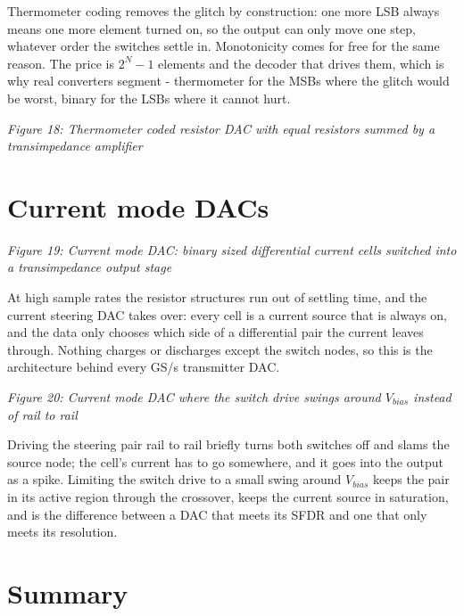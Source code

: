 Thermometer coding removes the glitch by construction: one more LSB
always means one more element turned on, so the output can only move one
step, whatever order the switches settle in. Monotonicity comes for free
for the same reason. The price is \(2^N - 1\) elements and the decoder
that drives them, which is why real converters segment - thermometer for
the MSBs where the glitch would be worst, binary for the LSBs where it
cannot hurt.


{
\centering
{}
}

\emph{Figure 18: Thermometer coded resistor DAC with equal resistors
summed by a transimpedance amplifier}

\section{Current mode DACs}\label{current-mode-dacs}


{
\centering
{}
}

\emph{Figure 19: Current mode DAC: binary sized differential current
cells switched into a transimpedance output stage}

At high sample rates the resistor structures run out of settling time,
and the current steering DAC takes over: every cell is a current source
that is always on, and the data only chooses which side of a
differential pair the current leaves through. Nothing charges or
discharges except the switch nodes, so this is the architecture behind
every GS/s transmitter DAC.


{
\centering
{}
}

\emph{Figure 20: Current mode DAC where the switch drive swings around
\(V_{bias}\) instead of rail to rail}

Driving the steering pair rail to rail briefly turns both switches off
and slams the source node; the cell's current has to go somewhere, and
it goes into the output as a spike. Limiting the switch drive to a small
swing around \(V_{bias}\) keeps the pair in its active region through
the crossover, keeps the current source in saturation, and is the
difference between a DAC that meets its SFDR and one that only meets its
resolution.

\section{Summary}\label{summary}

